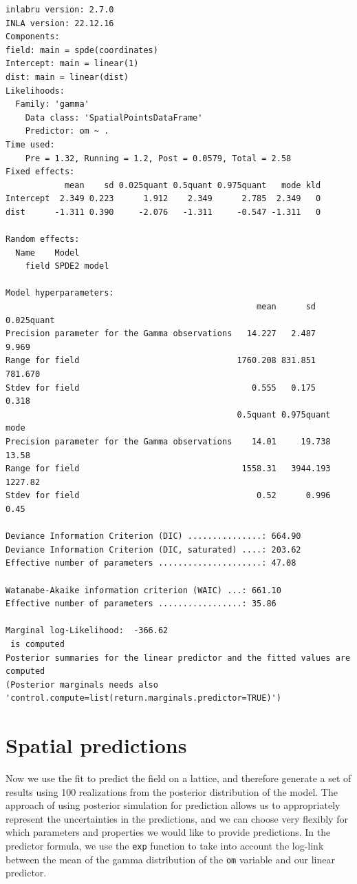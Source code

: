 \documentclass[
  a4paper,
]{article}
\begin{document}
\begin{verbatim}
inlabru version: 2.7.0
INLA version: 22.12.16
Components:
field: main = spde(coordinates)
Intercept: main = linear(1)
dist: main = linear(dist)
Likelihoods:
  Family: 'gamma'
    Data class: 'SpatialPointsDataFrame'
    Predictor: om ~ .
Time used:
    Pre = 1.32, Running = 1.2, Post = 0.0579, Total = 2.58 
Fixed effects:
            mean    sd 0.025quant 0.5quant 0.975quant   mode kld
Intercept  2.349 0.223      1.912    2.349      2.785  2.349   0
dist      -1.311 0.390     -2.076   -1.311     -0.547 -1.311   0

Random effects:
  Name    Model
    field SPDE2 model

Model hyperparameters:
                                                   mean      sd 0.025quant
Precision parameter for the Gamma observations   14.227   2.487      9.969
Range for field                                1760.208 831.851    781.670
Stdev for field                                   0.555   0.175      0.318
                                               0.5quant 0.975quant    mode
Precision parameter for the Gamma observations    14.01     19.738   13.58
Range for field                                 1558.31   3944.193 1227.82
Stdev for field                                    0.52      0.996    0.45

Deviance Information Criterion (DIC) ...............: 664.90
Deviance Information Criterion (DIC, saturated) ....: 203.62
Effective number of parameters .....................: 47.08

Watanabe-Akaike information criterion (WAIC) ...: 661.10
Effective number of parameters .................: 35.86

Marginal log-Likelihood:  -366.62 
 is computed 
Posterior summaries for the linear predictor and the fitted values are computed
(Posterior marginals needs also 'control.compute=list(return.marginals.predictor=TRUE)')
\end{verbatim}

\hypertarget{spatial-predictions}{%
\section{Spatial predictions}\label{spatial-predictions}}

Now we use the fit to predict the field on a lattice, and therefore
generate a set of results using 100 realizations from the posterior
distribution of the model. The approach of using posterior simulation
for prediction allows us to appropriately represent the uncertainties in
the predictions, and we can choose very flexibly for which parameters
and properties we would like to provide predictions. In the predictor
formula, we use the \texttt{exp} function to take into account the
log-link between the mean of the gamma distribution of the \texttt{om}
variable and our linear predictor.
\end{document}
